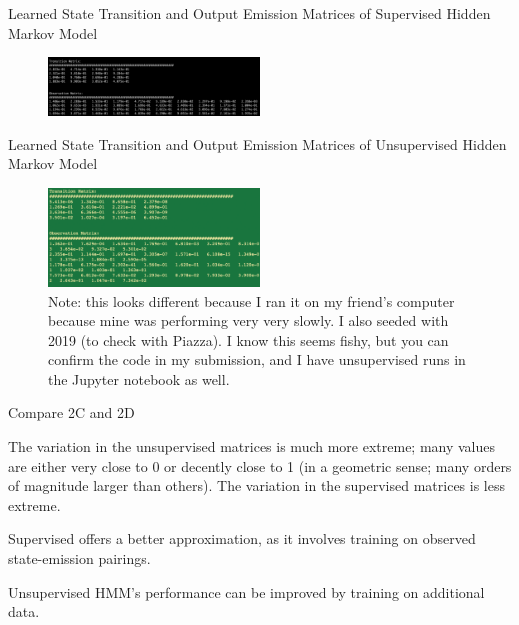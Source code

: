 \noindent\problem[10] %
Learned State Transition and Output Emission Matrices of Supervised Hidden Markov Model
\begin{subsolution}
\begin{figure}[H]
	\centering
	\includegraphics[width=0.5\textwidth]{img/set6template-70fa94d2.png}
	\caption{}
	\label{}
\end{figure}
\end{subsolution}
\clearpage

\indent\problem[15] %
Learned State Transition and Output Emission Matrices of Unsupervised Hidden Markov Model
\begin{subsolution}
\begin{figure}[H]
	\centering
	\includegraphics[width=0.5\textwidth]{img/set6template-ef31ef67.png}
	\caption{Note: this looks different because I ran it on my friend's computer because mine was performing very very slowly. I also
  seeded with 2019 (to check with Piazza). I know this seems fishy, but you can confirm the code in my submission, and I have unsupervised runs in the
  Jupyter notebook as well.}
	\label{}
\end{figure}
\end{subsolution}
\clearpage

\problem[5] Compare 2C and 2D
\begin{subsolution}
The variation in the unsupervised matrices is much more extreme; many values are either very close to 0 or decently close to 1 (in a geometric sense; many orders of magnitude larger than others).
The variation in the supervised matrices is less extreme.

Supervised offers a better approximation, as it involves training on observed state-emission pairings.

Unsupervised HMM's performance can be improved by training on additional data.



\end{subsolution}
\clearpage

